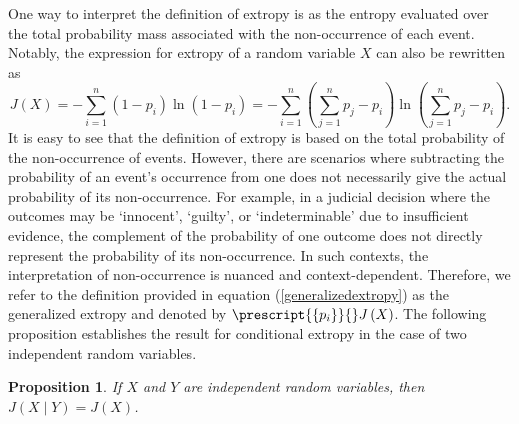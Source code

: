 \documentclass[pdflatex]{sn-jnl}%
\theoremstyle{thmstyleone}
\newtheorem{proposition}{Proposition}
\theoremstyle{thmstyletwo}%
\theoremstyle{thmstylethree}%
\begin{document}
One way to interpret the definition of extropy is as the entropy evaluated over the total probability mass associated with the non-occurrence of each event. Notably, the expression for extropy of a random variable $X$ can also be rewritten as
\begin{equation}\label{generalizedextropy}
    J\left( X\right)=-\sum_{i=1}^{n}\left(1-p_i\right)\ln\left(1-p_i\right)=-\sum_{i=1}^{n}\left(\sum_{j=1}^{n}p_j-p_i\right)\ln\left(\sum_{j=1}^{n}p_j-p_i\right).
\end{equation}
It is easy to see that the definition of extropy is based on the total probability of the non-occurrence of events. However, there are scenarios where subtracting the probability of an event's occurrence from one does not necessarily give the actual probability of its non-occurrence. For example, in a judicial decision where the outcomes may be `innocent', `guilty', or `indeterminable' due to insufficient evidence, the complement of the probability of one outcome does not directly represent the probability of its non-occurrence. In such contexts, the interpretation of non-occurrence is nuanced and context-dependent. Therefore, we refer to the definition provided in equation (\ref{generalizedextropy}) as the generalized extropy and denoted by $\prescript{\{p_i\}}{}J\left(X\right)$. The following proposition establishes the result for conditional extropy in the case of two independent random variables.
\begin{proposition}
    If $X$ and $Y$ are independent random variables, then
$J(X \mid Y) = J(X)$.
\end{proposition}
\end{document}
